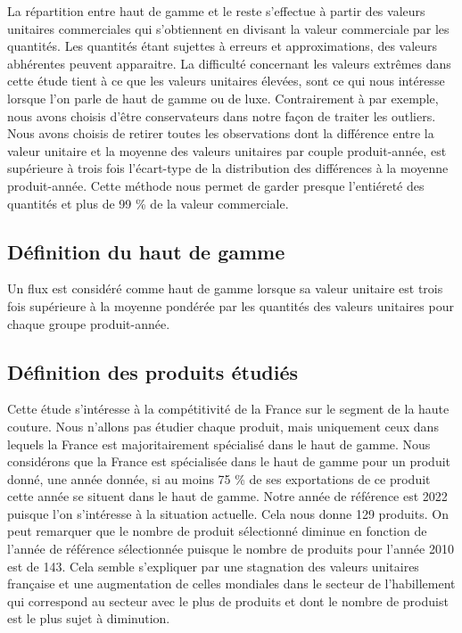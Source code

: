 \documentclass[french,10pt,a4paper]{article}
\begin{document}
La répartition entre haut de gamme et le reste s'effectue à partir des valeurs unitaires commerciales qui s'obtiennent en divisant la valeur commerciale par les quantités. Les quantités étant sujettes à erreurs et approximations, des valeurs abhérentes peuvent apparaitre. La difficulté concernant les valeurs extrêmes dans cette étude tient à ce que les valeurs unitaires élevées, sont ce qui nous intéresse lorsque l'on parle de haut de gamme ou de luxe. Contrairement à \cite{Fontagne2013} par exemple, nous avons choisis d'être conservateurs dans notre façon de traiter les outliers. Nous avons choisis de retirer toutes les observations dont la différence entre la valeur unitaire et la moyenne des valeurs unitaires par couple produit-année, est supérieure à trois fois l'écart-type de la distribution des différences à la moyenne produit-année. Cette méthode nous permet de garder presque l'entiéreté des quantités et plus de 99 \% de la valeur commerciale.


\subsection{Définition du haut de gamme}

Un flux est considéré comme haut de gamme lorsque sa valeur unitaire est trois fois supérieure à la moyenne pondérée par les quantités des valeurs unitaires pour chaque groupe produit-année.

\subsection{Définition des produits étudiés}

Cette étude s'intéresse à la compétitivité de la France sur le segment de la haute couture. Nous n'allons pas étudier chaque produit, mais uniquement ceux dans lequels la France est majoritairement spécialisé dans le haut de gamme. Nous considérons que la France est spécialisée dans le haut de gamme pour un produit donné, une année donnée, si au moins 75 \% de ses exportations de ce produit cette année se situent dans le haut de gamme. Notre année de référence est 2022 puisque l'on s'intéresse à la situation actuelle. Cela nous donne 129 produits. On peut remarquer que le nombre de produit sélectionné diminue en fonction de l'année de référence sélectionnée puisque le nombre de produits pour l'année 2010 est de 143. Cela semble s'expliquer par une stagnation des valeurs unitaires française et une augmentation de celles mondiales dans le secteur de l'habillement qui correspond au secteur avec le plus de produits et dont le nombre de produist est le plus sujet à diminution.
\end{document}

